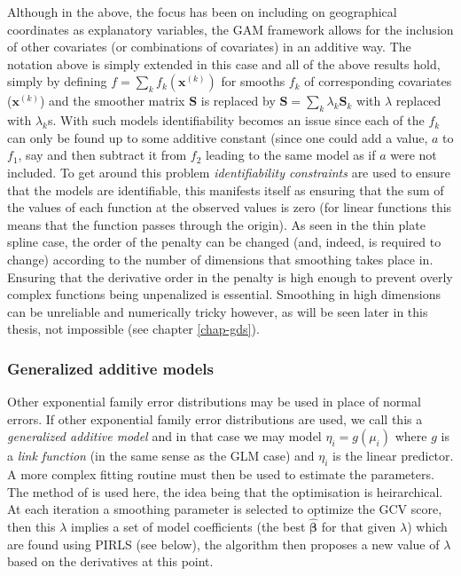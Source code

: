 Although in the above, the focus has been on including on geographical coordinates as explanatory variables, the GAM framework allows for the inclusion of other covariates (or combinations of covariates) in an additive way. The notation above is simply extended in this case and all of the above results hold, simply by defining $f=\sum_k f_k(\mathbf{x}^{(k)})$ for smooths $f_k$ of corresponding covariates ($\mathbf{x}^{(k)}$) and the smoother matrix $\mathbf{S}$ is replaced by $\mathbf{S}= \sum_k \lambda_k \mathbf{S}_k$ with $\lambda$ replaced with $\lambda_k$s. With such models identifiability becomes an issue since each of the $f_k$ can only be found up to some additive constant (since one could add a value, $a$ to $f_1$, say and then subtract it from $f_2$ leading to the same model as if $a$ were not included. To get around this problem \textit{identifiability constraints} are used to ensure that the models are identifiable, this manifests itself as ensuring that the sum of the values of each function at the observed values is zero (for linear functions this means that the function passes through the origin). As seen in the thin plate spline case, the order of the penalty can be changed (and, indeed, is required to change) according to the number of dimensions that smoothing takes place in. Ensuring that the derivative order in the penalty is high enough to prevent overly complex functions being unpenalized is essential. Smoothing in high dimensions can be unreliable and numerically tricky however, as will be seen later in this thesis, not impossible (see chapter \ref{chap-gds}).

\subsubsection{Generalized additive models}

Other exponential family error distributions may be used in place of normal errors. If other exponential family error distributions are used, we call this a \textit{generalized additive model} and in that case we may model $\eta_i=g(\mu_i)$ where $g$ is a \textit{link function} (in the same sense as the GLM case) and $\eta_i$ is the linear predictor. A more complex fitting routine must then be used to estimate the parameters. The method of  is used here, the idea being that the optimisation is heirarchical. At each iteration a smoothing parameter is selected to optimize the GCV score, then this $\lambda$ implies a set of model coefficients (the best $\bm{\hat{\beta}}$ for that given $\lambda$) which are found using PIRLS (see below), the algorithm then proposes a new value of $\lambda$ based on the derivatives at this point.

